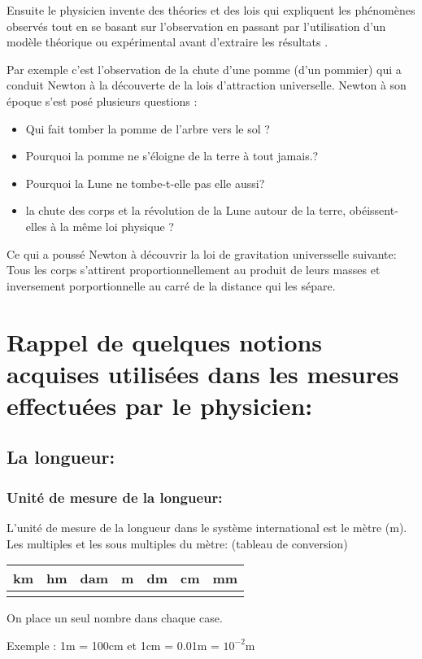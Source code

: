 \documentclass[12pt]{article}
\begin{document}
      Ensuite le physicien invente des théories et des lois qui expliquent les phénomènes observés tout en se basant sur
l'observation en passant par l'utilisation d'un modèle théorique ou expérimental avant d'extraire les résultats .

Par exemple c'est l'observation de la chute d'une pomme (d’un pommier) qui a conduit Newton à la découverte de la
lois d'attraction universelle.
Newton à son époque s’est posé plusieurs questions :
\begin{itemize}
   \item Qui fait tomber la pomme de l’arbre vers le sol ?
   \item Pourquoi la pomme ne s'éloigne de la terre à tout jamais.?
   \item Pourquoi la Lune ne tombe-t-elle pas elle aussi?
   \item la chute des corps et la révolution de la Lune autour de la terre, obéissent-elles à la même loi physique ?
      \end{itemize}
Ce qui a poussé Newton à découvrir la loi de gravitation universselle suivante:
Tous les corps s'attirent proportionnellement au produit de leurs masses et inversement porportionnelle au carré de la
distance qui les sépare.
\section{Rappel de quelques notions acquises utilisées dans les mesures effectuées par le physicien:}

\subsection{La longueur:}
\subsubsection{Unité de mesure de la longueur: }
L'unité de mesure de la longueur dans le système international est le mètre (m).
Les multiples et les sous multiples du mètre: (tableau de conversion)

\begin{center}
   \begin{tabular}{ |c|c|c|c|c|c|c| }
      \hline
      km & hm & dam & \bf{m} & dm & cm & mm \\
      \hline
        &   &    &  &   &   & \\
\hline
\end{tabular}
On place un seul nombre dans chaque case.
\end{center}
Exemple : 1m  =  100cm et 1cm = 0.01m = $10^{-2}$m
\end{document}
